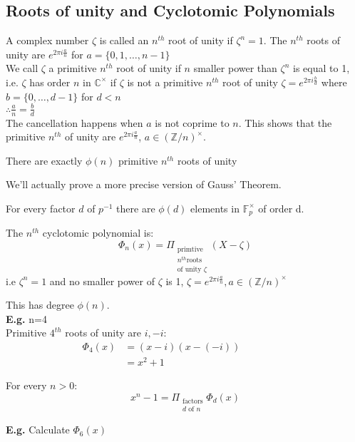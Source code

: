 \documentclass[11pt]{article}
\begin{document}
\subsection{Roots of unity and Cyclotomic Polynomials}
A complex number $\zeta$ is called an $n^{th}$ root of unity if $\zeta ^n = 1$. The $n^{th}$ roots of unity are $e^{2\pi i \frac{a}{n}}$ for $a = \{0, 1, \dots, n-1\} $\\
We call $\zeta$ a primitive $n^{th}$ root of unity if $n$ smaller power than $\zeta^n$ is equal to 1, i.e. $\zeta$ has order $n$ in $\mathbb{C}^\times$ if $\zeta$ is not a primitive $n^{th}$ root of unity $\zeta = e^{2\pi i \frac{b}{d}}$ where $b = \{0,\dots, d-1\}$ for $d<n$\\
$\therefore \frac{a}{n} = \frac{b}{d}$\\[1em]
The cancellation happens when $a$ is not coprime to $n$. This shows that the primitive $n^{th}$ of unity are $e^{2\pi i \frac{a}{n}}$, $a \in (\mathbb{Z}/n)^\times$.

\begin{corollary}
	There are exactly $\phi(n)$ primitive $n^{th}$ roots of unity
\end{corollary}
We'll actually prove a more precise version of Gauss' Theorem.
\begin{theorem}
	For every factor $d$ of $p^{-1}$ there are $\phi(d)$ elements in $\mathbb{F}^{\times}_{p}$ of order d.
\end{theorem}
\begin{definition}
	The $n^{th}$ cyclotomic polynomial is:
	\begin{equation*}
		\Phi_{n} (x) = \Pi_{\substack{\text{primtive }\\ n^{th} \text{roots}\\ \text{of unity } \zeta }  }(X- \zeta)  
	\end{equation*}
	i.e $\zeta ^n = 1 $ and no smaller power of $\zeta$ is 1, $\zeta = e^{2 \pi i \frac{a}{n} }, a \in (\mathbb{Z}/n)^\times$
\end{definition}
This has degree $\phi(n)$.\\[1em]
\newpage{}
\textbf{E.g.} n=4\\
Primitive  $4^{th}$ roots of unity are $i,-i$:
\begin{align*}
	\Phi_4(x) &= (x-i)(x-(-i))&&&&&&\\
	&= x^2 + 1
\end{align*}

\begin{lemma}
	For every $n>0$:
	\begin{equation*}
		x^n - 1 = \Pi_{\substack{\text{factors}\\ d \text{ of } n }} \Phi_{d} (x)
	\end{equation*}
\end{lemma}
\textbf{E.g.} Calculate $\Phi_6 (x)$
\end{document}
